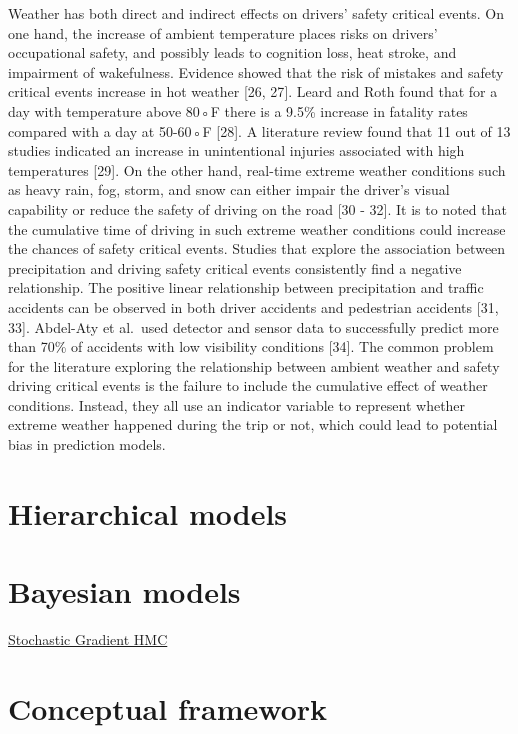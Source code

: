 \documentclass[12pt]{book}
\numberwithin{equation}{chapter}
\begin{document}
Weather has both direct and indirect effects on drivers' safety critical events. On one hand, the increase of ambient temperature places risks on drivers' occupational safety, and possibly leads to cognition loss, heat stroke, and impairment of wakefulness. Evidence showed that the risk of mistakes and safety critical events increase in hot weather {[}26, 27{]}. Leard and Roth found that for a day with temperature above 80◦F there is a 9.5\% increase in fatality rates compared with a day at 50-60◦F {[}28{]}. A literature review found that 11 out of 13 studies indicated an increase in unintentional injuries associated with high temperatures {[}29{]}. On the other hand, real-time extreme weather conditions such as heavy rain, fog, storm, and snow can either impair the driver's visual capability or reduce the safety of driving on the road {[}30 - 32{]}. It is to noted that the cumulative time of driving in such extreme weather conditions could increase the chances of safety critical events. Studies that explore the association between precipitation and driving safety critical events consistently find a negative relationship. The positive linear relationship between precipitation and traffic accidents can be observed in both driver accidents and pedestrian accidents {[}31, 33{]}. Abdel-Aty et al.~used detector and sensor data to successfully predict more than 70\% of accidents with low visibility conditions {[}34{]}. The common problem for the literature exploring the relationship between ambient weather and safety driving critical events is the failure to include the cumulative effect of weather conditions. Instead, they all use an indicator variable to represent whether extreme weather happened during the trip or not, which could lead to potential bias in prediction models.

\hypertarget{hierarchical-models}{%
\section{Hierarchical models}\label{hierarchical-models}}

\hypertarget{bayesian-models}{%
\section{Bayesian models}\label{bayesian-models}}

\href{https://blog.csdn.net/u013841458/article/details/82495450}{Stochastic Gradient HMC}

\hypertarget{conceptual-framework}{%
\section{Conceptual framework}\label{conceptual-framework}}
\end{document}
